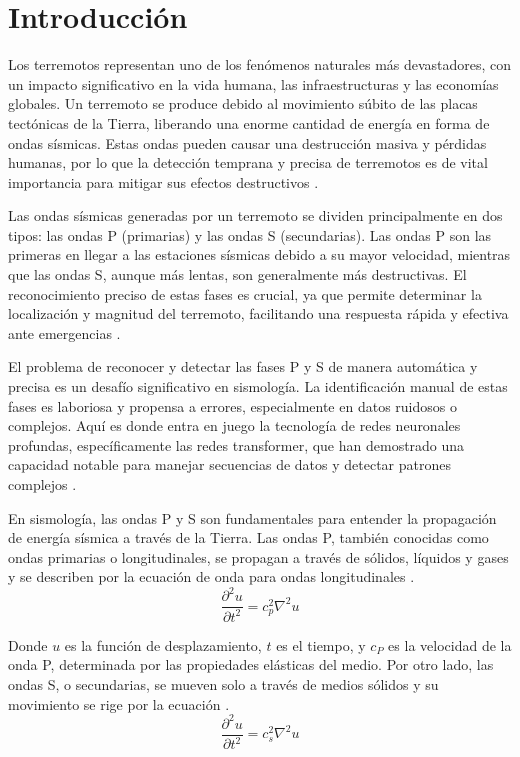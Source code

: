\chapter{Introducción}

Los terremotos representan uno de los fenómenos naturales más devastadores, con un impacto significativo en la vida humana, las infraestructuras y las economías globales. Un terremoto se produce debido al movimiento súbito de las placas tectónicas de la Tierra, liberando una enorme cantidad de energía en forma de ondas sísmicas. Estas ondas pueden causar una destrucción masiva y pérdidas humanas, por lo que la detección temprana y precisa de terremotos es de vital importancia para mitigar sus efectos destructivos \cite{Joswig} \cite{havskov2008processing}.

Las ondas sísmicas generadas por un terremoto se dividen principalmente en dos tipos: las ondas P (primarias) y las ondas S (secundarias). Las ondas P son las primeras en llegar a las estaciones sísmicas debido a su mayor velocidad, mientras que las ondas S, aunque más lentas, son generalmente más destructivas. El reconocimiento preciso de estas fases es crucial, ya que permite determinar la localización y magnitud del terremoto, facilitando una respuesta rápida y efectiva ante emergencias \cite{havskov2008processing}.

El problema de reconocer y detectar las fases P y S de manera automática y precisa es un desafío significativo en sismología. La identificación manual de estas fases es laboriosa y propensa a errores, especialmente en datos ruidosos o complejos. Aquí es donde entra en juego la tecnología de redes neuronales profundas, específicamente las redes transformer, que han demostrado una capacidad notable para manejar secuencias de datos y detectar patrones complejos \cite{havskov2008processing} \cite{SUGONDO2021e08605}.

En sismología, las ondas P y S son fundamentales para entender la propagación de energía sísmica a través de la Tierra. Las ondas P, también conocidas como ondas primarias o longitudinales, se propagan a través de sólidos, líquidos y gases y se describen por la ecuación de onda para ondas longitudinales \cite{chapman2004fundamentals} .
\begin{equation*}
\frac{\partial^{2}u}{\partial t^{2}} = c_{p}^{2}\nabla^{2}u
\end{equation*}

Donde $u$ es la función de desplazamiento, $t$ es el tiempo, y $c_{P}$ es la velocidad de la onda P, determinada por las propiedades elásticas del medio. Por otro lado, las ondas S, o secundarias, se mueven solo a través de medios sólidos y su movimiento se rige por la ecuación \cite{chapman2004fundamentals}.
\begin{equation*}
\frac{\partial^{2}u}{\partial t^{2}} = c_{s}^{2}\nabla^{2}u
\end{equation*}

